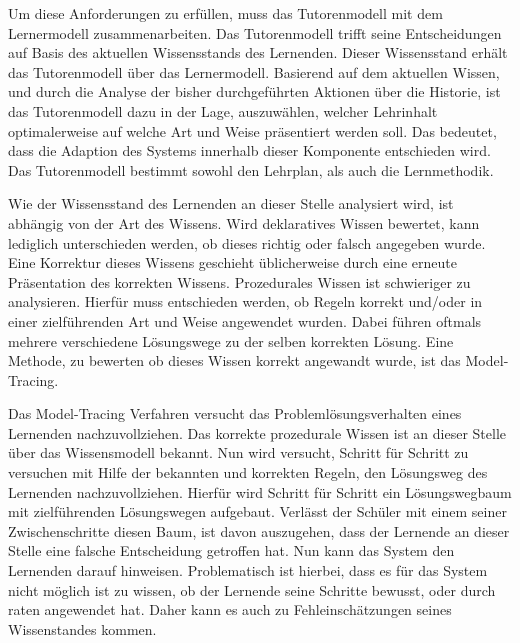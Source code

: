 Um diese Anforderungen zu erfüllen, muss das Tutorenmodell mit dem Lernermodell zusammenarbeiten.
Das Tutorenmodell trifft seine Entscheidungen auf Basis des aktuellen Wissensstands des Lernenden.
Dieser Wissensstand erhält das Tutorenmodell über das Lernermodell.
Basierend auf dem aktuellen Wissen, und durch die Analyse der bisher durchgeführten Aktionen über die Historie,
ist das Tutorenmodell dazu in der Lage, auszuwählen, welcher Lehrinhalt optimalerweise auf welche Art und Weise präsentiert werden soll.
Das bedeutet, dass die Adaption des Systems innerhalb dieser Komponente entschieden wird.
Das Tutorenmodell bestimmt sowohl den Lehrplan, als auch die Lernmethodik.

Wie der Wissensstand des Lernenden an dieser Stelle analysiert wird, ist abhängig von der Art des Wissens.
Wird deklaratives Wissen bewertet, kann lediglich unterschieden werden, ob dieses richtig oder falsch angegeben wurde.
Eine Korrektur dieses Wissens geschieht üblicherweise durch eine erneute Präsentation des korrekten Wissens.
Prozedurales Wissen ist schwieriger zu analysieren. Hierfür muss entschieden werden, ob Regeln korrekt und/oder in einer zielführenden
Art und Weise angewendet wurden. Dabei führen oftmals mehrere verschiedene Lösungswege zu der selben korrekten Lösung.
Eine Methode, zu bewerten ob dieses Wissen korrekt angewandt wurde, ist das Model-Tracing.

Das Model-Tracing Verfahren versucht das Problemlösungsverhalten eines Lernenden nachzuvollziehen.
Das korrekte prozedurale Wissen ist an dieser Stelle über das Wissensmodell bekannt.
Nun wird versucht, Schritt für Schritt zu versuchen mit Hilfe der bekannten und korrekten Regeln, den Lösungsweg des Lernenden nachzuvollziehen.
Hierfür wird Schritt für Schritt ein Lösungswegbaum mit zielführenden Lösungswegen aufgebaut.
Verlässt der Schüler mit einem seiner Zwischenschritte diesen Baum, ist davon auszugehen, dass der Lernende
an dieser Stelle eine falsche Entscheidung getroffen hat. Nun kann das System den Lernenden darauf hinweisen.
Problematisch ist hierbei, dass es für das System nicht möglich ist zu wissen, ob der Lernende seine Schritte
bewusst, oder durch raten angewendet hat. Daher kann es auch zu Fehleinschätzungen seines Wissenstandes kommen.

